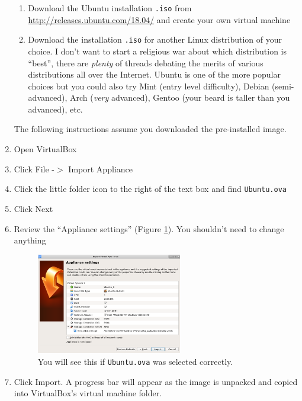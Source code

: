 \documentclass{lab}
\begin{document}
\begin{enumerate}
\begin{enumerate}
		\item Download the Ubuntu installation \texttt{.iso} from \url{http://releases.ubuntu.com/18.04/} and create your own virtual machine
		\item Download the installation \texttt{.iso} for another Linux distribution of your choice. I don't want to start a religious war about which distribution is ``best'', there are \textit{plenty} of threads debating the merits of various distributions all over the Internet. Ubuntu is one of the more popular choices but you could also try Mint (entry level difficulty), Debian (semi-advanced), Arch (\textit{very} advanced), Gentoo (your beard is taller than you advanced), etc.
	\end{enumerate}
	\pagebreak
	The following instructions assume you downloaded the pre-installed image.
\item Open VirtualBox
\item Click File -$>$ Import Appliance
\item Click the little folder icon to the right of the text box and find \texttt{Ubuntu.ova}
\item Click Next
\item Review the ``Appliance settings'' (Figure \ref{fig:virtualbox1}). You shouldn't need to change anything

\begin{figure}[H]
\begin{center}
\includegraphics[width=0.6\textwidth]{Wk1Images/ubuntu_import.png}
\end{center}
\caption{You will see this if \texttt{Ubuntu.ova} was selected correctly.}\label{fig:virtualbox1}
\end{figure}

\item Click Import. A progress bar will appear as the image is unpacked and copied into VirtualBox's virtual machine folder.


\end{enumerate}
\end{document}
